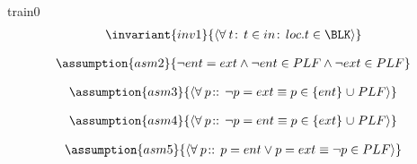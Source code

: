 \documentclass[12pt]{amsart}
\begin{document}
\begin{machine}{train0}
\begin{align*}
\invariant{inv1}
{	\qforall{t}{t \in in}{loc.t \in \BLK}	}
\end{align*}

\begin{align*}\assumption{asm2}
{	\neg ent = ext \land \neg ent \in PLF \land \neg ext \in PLF	}
\end{align*}

\begin{align*}\assumption{asm3}
{	\qforall{p}{}{ \neg p = ext \equiv p \in \{ent\} \bunion PLF }	}
\end{align*}

\begin{align*}\assumption{asm4}
{	\qforall{p}{}{ \neg p = ent \equiv p \in \{ext\} \bunion PLF }	}
\end{align*}

\begin{align*}\assumption{asm5}
{	\qforall{p}{}{ p = ent \lor p = ext \equiv \neg p \in PLF }	}
\end{align*}

\end{machine}
\end{document}
